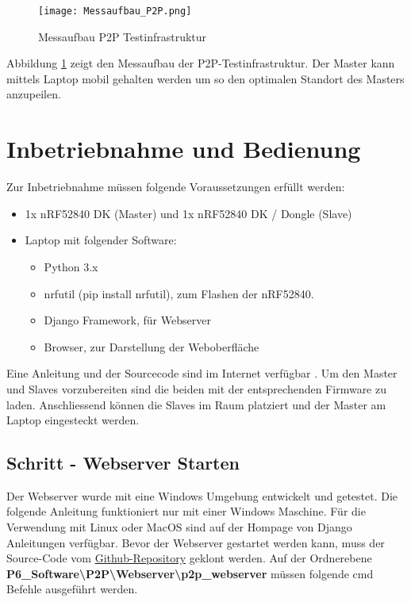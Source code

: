 \begin{figure} [H]
	\centering
	\texttt{[image: Messaufbau\_P2P.png]}
	\caption{Messaufbau P2P Testinfrastruktur}
	\label{fig:MessaufbauP2P}
\end{figure}

Abbildung \ref{fig:MessaufbauP2P} zeigt den Messaufbau der P2P-Testinfrastruktur. Der Master kann mittels Laptop mobil gehalten werden um so den optimalen Standort des Masters anzupeilen. 


\newpage
\section{Inbetriebnahme und Bedienung}\label{sec:InbetriebnahmeBedienungP2P}


Zur Inbetriebnahme müssen folgende Voraussetzungen erfüllt werden: 

\begin{itemize}
	\item 1x nRF52840 DK (Master) und 1x nRF52840 DK / Dongle (Slave)
	\item Laptop mit folgender Software:
	\begin{itemize}
		\item Python 3.x
		\item nrfutil (pip install nrfutil), zum Flashen der nRF52840. 
		\item Django Framework, für Webserver
		\item Browser, zur Darstellung der Weboberfläche
	\end{itemize}
\end{itemize}


Eine Anleitung und der Sourcecode sind im Internet verfügbar \cite{github_p6_software_p2p_2020}. Um den Master und Slaves vorzubereiten sind die beiden mit der entsprechenden Firmware zu laden. Anschliessend können die Slaves im Raum platziert und der Master am Laptop eingesteckt werden.  


\subsection{Schritt - Webserver Starten}\label{sec:SchrittWebserverStarten}
Der Webserver wurde mit eine Windows Umgebung entwickelt und getestet. Die folgende Anleitung funktioniert nur mit einer Windows Maschine. Für die Verwendung mit Linux oder MacOS sind auf der Hompage von Django Anleitungen verfügbar.
Bevor der Webserver gestartet werden kann, muss der Source-Code vom \href{https://github.com/Rouben94/P6_Software}{Github-Repository\footnotemark[\value{footnote}]} geklont werden. Auf der Ordnerebene \textbf{P6\_Software\textbackslash P2P\textbackslash Webserver\textbackslash p2p\_webserver} müssen folgende cmd Befehle ausgeführt werden.

